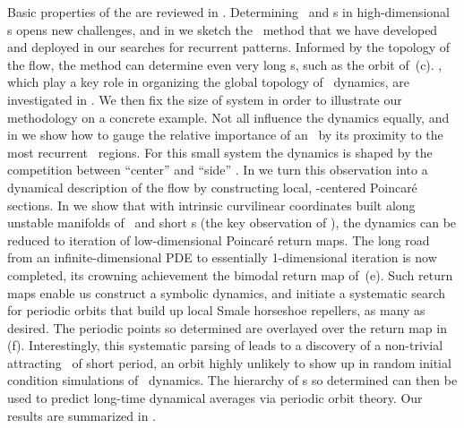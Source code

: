 Basic properties of the {\KSe} are reviewed in .
Determining \eqva\ and \po s in high-dimensional \statesp s
opens new challenges, and
in  we sketch the \descent\ method
that we have developed and deployed
in our searches for recurrent patterns.
Informed by the topology of the flow, the method can
determine even very long \po s, such as the
orbit of \,(c).
\Eqva, which play a key role
in organizing the global topology of
\statesp\ dynamics, are investigated
in .
We then fix the
size of  {\KS} system  in order to illustrate our
methodology on a concrete example.
Not all {\eqva}
influence the dynamics equally, and in 
we show how to gauge the relative importance of an \eqv\ by its
proximity to the most recurrent \statesp\ regions.
For this small {\KS} system the dynamics is shaped by
the competition between ``center'' and ``side'' \eqva.
In  we turn this observation into a
dynamical description of the flow by constructing local,
\eqv-centered Poincar\'{e} sections.
In  we show that with
intrinsic curvilinear coordinates built along unstable manifolds
of \eqva\ and short \po s
(the key observation of ), the dynamics can be reduced
to iteration of low-dimensional
Poincar\'{e} return maps.
The long road from an infinite-dimensional PDE to
essentially 1-dimensional iteration is now completed,
its crowning achievement the bimodal return map of
\,(e).
Such return maps enable us construct
a symbolic dynamics, and initiate a systematic
search for periodic orbits that build up
local Smale horseshoe repellers, as many as
desired.
The periodic points so determined are
overlayed over the return map in \,(f).
Interestingly,
this systematic parsing of {\statesp}
leads to a discovery of a non-trivial
{attracting} \po\ of short period, an orbit highly
unlikely to show up in random initial condition simulations of
\KS\ dynamics.
The hierarchy of \po s so determined can
then be used to predict long-time dynamical averages
via periodic orbit theory.
Our results are summarized in .
